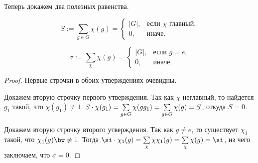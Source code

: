 Теперь докажем два полезных равенства.

\begin{stm}
  $$
    S := \sum_{g \in G} \chi(g) = \begin{cases}
      |G|,& \mbox{если $\chi$ главный,}\\
      0,& \mbox{иначе.}
    \end{cases}
  $$
\end{stm}

\begin{stm}
  $$
    \sigma := \sum_{\chi} \chi(g) = \begin{cases}
      |G|,& \mbox{если $g = e$,}\\
      0,& \mbox{иначе.}
    \end{cases}
  $$
\end{stm}

\begin{proof}
  Первые строчки в обоих утверждениях очевидны.

  Докажем вторую строчку первого утверждения. 
	Так как $\chi$ неглавный, то найдется $g_1$ такой, что $\chi(g_1) \ne 1$. 
	$S\cdot\chi(g_1)= \sum\limits_{g \in G} \chi(g g_1) 
	= \sum\limits_{g \in G} \chi(g) = S$, откуда $S = 0$.

  Докажем вторую строчку второго утверждения. 
	Так как $g \ne e$, то существует $\chi_1$ такой, что $\chi_1(g) \bw\ne 1$. 
	Тогда $\si\cdot\chi_1(g)=\sumlim_\chi\chi\chi_1(g)=\sumlim_\chi\chi(g)=\si$,
	из чего заключаем, что $\sigma = 0$.
\end{proof}

